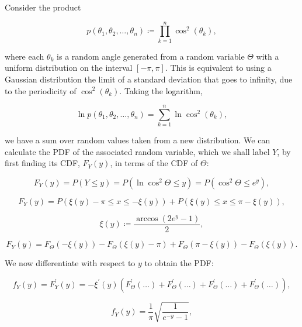 Consider the product

$$p\left( \theta_1, \theta_2, \ldots, \theta_n \right) \coloneqq \prod_{k=1}^n \cos^2 \left( \theta_k \right),$$

where each $\theta_k$ is a random angle generated from a random variable $\Theta$ with a uniform distribution on the interval $\left[ -\pi,\pi \right]$. This is equivalent to using a Gaussian distribution the limit of a standard deviation that goes to infinity, due to the periodicity of $\cos^2 \left( \theta_k \right)$. Taking the logarithm,

$$\ln p\left( \theta_1, \theta_2, \ldots, \theta_n \right) = \sum_{k=1}^n \ln \cos^2 \left( \theta_k \right),$$

we have a sum over random values taken from a new distribution. We can calculate the PDF of the associated random variable, which we shall label $Y$, by first finding its CDF, $F_Y \left(y\right)$, in terms of the CDF of $\Theta$:

$$F_Y \left(y\right) = P \left(Y \leq y\right) = P \left(\ln \cos^2 \Theta \leq y\right) = P \left(\cos^2 \Theta \leq e^y\right),$$

$$F_Y \left(y\right) = P \left(\xi\left(y\right) - \pi \leq x \leq -\xi\left(y\right) \right) + P \left(\xi\left(y\right) \leq x \leq \pi - \xi\left(y\right) \right),$$

$$\xi\left(y\right) \coloneqq \frac{\arccos\left(2e^y - 1\right)}{2},$$

\vspace{-0.4em}

$$F_Y \left(y\right) = F_\Theta \left(-\xi\left(y\right)\right) - F_\Theta \left(\xi\left(y\right) - \pi\right) + F_\Theta \left(\pi - \xi\left(y\right)\right) - F_\Theta \left(\xi\left(y\right)\right).$$

\vspace{0.4em}

We now differentiate with respect to $y$ to obtain the PDF:

\vspace{-0.4em}

$$f_Y \left(y\right) = F_Y^\prime \left(y\right) = -\xi^\prime\left(y\right) \left( F_\Theta^\prime\left(\ldots\right) + F_\Theta^\prime\left(\ldots\right) + F_\Theta^\prime\left(\ldots\right) + F_\Theta^\prime\left(\ldots\right) \right),$$

$$f_Y \left(y\right) = \frac{1}{\pi} \sqrt{\frac{1}{e^{-y}-1}},$$

\vspace{0.8em}

